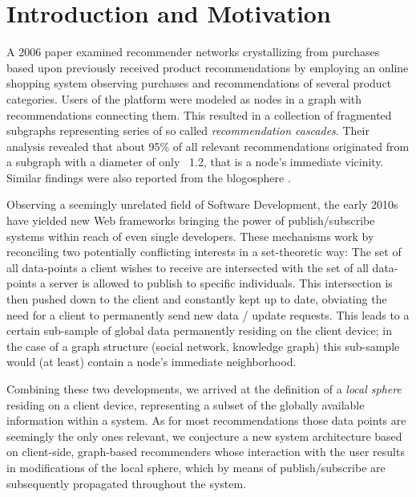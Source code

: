 \documentclass{llncs}
\begin{document}
\renewcommand{\thesubfigure}{\thefigure.\arabic{subfigure}}
\makeatletter
\renewcommand{\p@subfigure}{}
\renewcommand{\@thesubfigure}{\thesubfigure:\hskip\subfiglabelskip}
\makeatother


\section{Introduction and Motivation}
\label{sect:intro_motivation}

A 2006 paper \cite{leskovec2006recpatterns} examined recommender networks crystallizing from purchases based upon previously received product recommendations by employing an online shopping system observing purchases and recommendations of several product categories. Users of the platform were modeled as nodes in a graph with recommendations connecting them. This resulted in a collection of fragmented subgraphs representing series of so called \textit{recommendation cascades}. Their analysis revealed that about 95\% of all relevant recommendations originated from a subgraph with a diameter of only ~1.2, that is a node's immediate vicinity. Similar findings were also reported from the blogosphere \cite{leskovec2007blogpatterns}.

Observing a seemingly unrelated field of Software Development, the early 2010s have yielded new Web frameworks bringing the power of publish/subscribe systems within reach of even single developers. These mechanisms work by reconciling two potentially conflicting interests in a set-theoretic way: The set of all data-points a client wishes to receive are intersected with the set of all data-points a server is allowed to publish to specific individuals. This intersection is then pushed down to the client and constantly kept up to date, obviating the need for a client to permanently send new data / update requests. This leads to a certain sub-sample of global data permanently residing on the client device; in the case of a graph structure (social network, knowledge graph) this sub-sample would (at least) contain a node's immediate neighborhood.

Combining these two developments, we arrived at the definition of a \textit{local sphere} residing on a client device, representing a subset of the globally available information within a system. As for most recommendations those data points are seemingly the only ones relevant, we conjecture a new system architecture based on client-side, graph-based recommenders whose interaction with the user results in modifications of the local sphere, which by means of publish/subscribe are subsequently propagated throughout the system.
\end{document}
